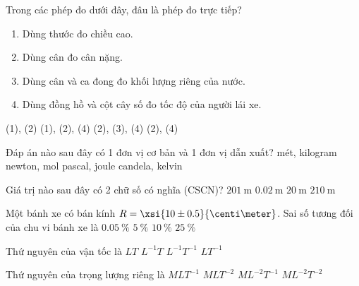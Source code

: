 \begin{ex}
	Trong các phép đo dưới đây, đâu là phép đo trực tiếp?
	\begin{enumerate}[label=(\arabic*)]
		\item Dùng thước đo chiều cao.
		\item Dùng cân đo cân nặng.
		\item Dùng cân và ca đong đo khối lượng riêng của nước.
		\item Dùng đồng hồ và cột cây số đo tốc độ của người lái xe.
	\end{enumerate}
	\choice
	{\True (1), (2)}
	{(1), (2), (4)}
	{(2), (3), (4)}
	{(2), (4)}
	\loigiai{}
\end{ex}

\begin{ex}
	Đáp án nào sau đây có 1 đơn vị cơ bản và 1 đơn vị dẫn xuất?
	\choice
	{mét, kilogram}
	{\True newton, mol}
	{pascal, joule}
	{candela, kelvin}
	\loigiai{}
\end{ex}

\begin{ex}
	Giá trị nào sau đây có 2 chữ số có nghĩa (CSCN)?
	\choice
	{$\SI{201}{\meter}$}
	{$\SI{0.02}{\meter}$}
	{$\SI{20}{\meter}$}
	{\True $\SI{210}{\meter}$}
	\loigiai{}
\end{ex}

\begin{ex}
	Một bánh xe có bán kính $R=\xsi{10\pm0.5}{\centi\meter}$. Sai số tương đối của chu vi bánh xe là
	\choice
	{$\SI{0.05}{\percent}$}
	{\True $\SI{5}{\percent}$}
	{$\SI{10}{\percent}$}
	{$\SI{25}{\percent}$}
\end{ex}

\begin{ex}
	Thứ nguyên của vận tốc là
	\choice
	{$LT$}
	{$L^{-1}T$}
	{$L^{-1}T^{-1}$}
	{\True $LT^{-1}$}
\end{ex}

\begin{ex}
	Thứ nguyên của trọng lượng riêng là
	\choice
	{$MLT^{-1}$}
	{$MLT^{-2}$}
	{$ML^{-2}T^{-1}$}
	{\True $ML^{-2}T^{-2}$}
\end{ex}
